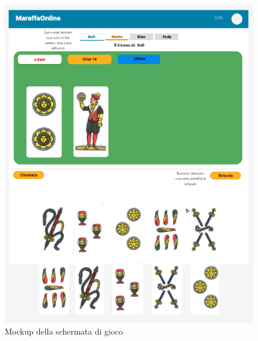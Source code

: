 \begin{figure}[h!]
    \centering 
    \includegraphics[scale=0.65]{report/img/game_mockup.png}
    \caption{ Mockup della schermata di gioco}
    \label{mockup}
\end{figure}


